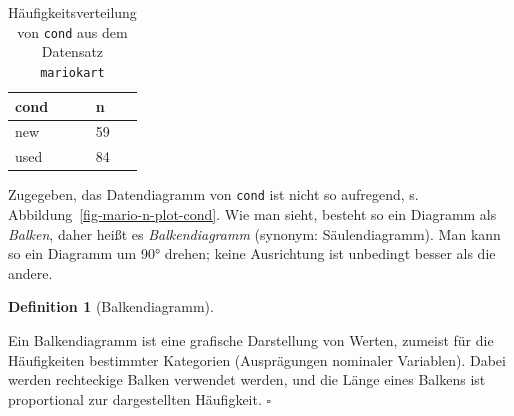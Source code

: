 \documentclass[
  letterpaper,
  oneside,
  open=any]{scrbook}
\theoremstyle{definition}
\theoremstyle{definition}
\theoremstyle{definition}
\newtheorem{definition}{Definition}[chapter]
\theoremstyle{remark}
\begin{document}
\begin{longtable}[]{@{}ll@{}}

\caption{\label{tbl-wheels-n}Häufigkeitsverteilung von \texttt{cond} aus
dem Datensatz \texttt{mariokart}}

\tabularnewline

\toprule\noalign{}
cond & n \\
\midrule\noalign{}
\endhead
\bottomrule\noalign{}
\endlastfoot
new & 59 \\
used & 84 \\

\end{longtable}

Zugegeben, das Datendiagramm von \texttt{cond} ist nicht so aufregend,
s. Abbildung~\ref{fig-mario-n-plot-cond}. Wie man sieht, besteht so ein
Diagramm als \emph{Balken}, daher heißt es \emph{Balkendiagramm}
(synonym: Säulendiagramm). Man kann so ein Diagramm um 90° drehen; keine
Ausrichtung ist unbedingt besser als die andere.

\begin{definition}[Balkendiagramm]\protect\hypertarget{def-balken}{}\label{def-balken}

Ein Balkendiagramm ist eine grafische Darstellung von Werten, zumeist
für die Häufigkeiten bestimmter Kategorien (Ausprägungen nominaler
Variablen). Dabei werden rechteckige Balken verwendet werden, und die
Länge eines Balkens ist proportional zur dargestellten Häufigkeit.
\(\square\)

\end{definition}
\end{document}
